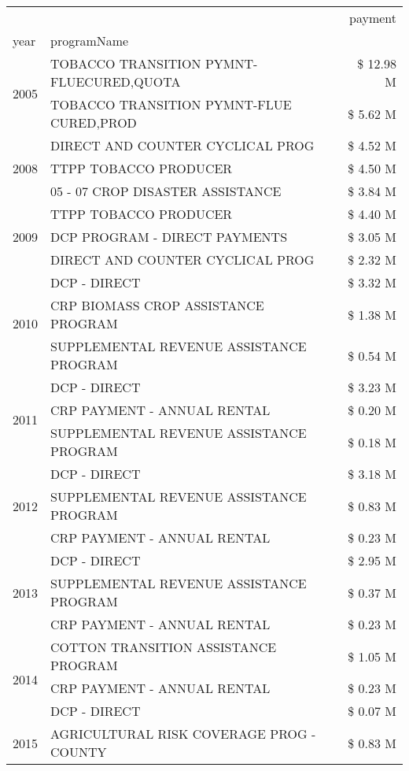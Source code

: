 \begin{tabular}{llr}
\toprule
 &  & payment \\
year & programName &  \\
\midrule
\multirow[t]{2}{*}{2005} & TOBACCO TRANSITION PYMNT-FLUECURED,QUOTA & \$ 12.98 M \\
 & TOBACCO TRANSITION PYMNT-FLUE CURED,PROD & \$ 5.62 M \\
\cline{1-3}
\multirow[t]{3}{*}{2008} & DIRECT AND COUNTER CYCLICAL PROG & \$ 4.52 M \\
 & TTPP TOBACCO PRODUCER & \$ 4.50 M \\
 & 05 - 07 CROP DISASTER ASSISTANCE & \$ 3.84 M \\
\cline{1-3}
\multirow[t]{3}{*}{2009} & TTPP TOBACCO PRODUCER & \$ 4.40 M \\
 & DCP PROGRAM - DIRECT PAYMENTS & \$ 3.05 M \\
 & DIRECT AND COUNTER CYCLICAL PROG & \$ 2.32 M \\
\cline{1-3}
\multirow[t]{3}{*}{2010} & DCP - DIRECT & \$ 3.32 M \\
 & CRP BIOMASS CROP ASSISTANCE PROGRAM & \$ 1.38 M \\
 & SUPPLEMENTAL REVENUE ASSISTANCE PROGRAM & \$ 0.54 M \\
\cline{1-3}
\multirow[t]{3}{*}{2011} & DCP - DIRECT & \$ 3.23 M \\
 & CRP PAYMENT - ANNUAL RENTAL & \$ 0.20 M \\
 & SUPPLEMENTAL REVENUE ASSISTANCE PROGRAM & \$ 0.18 M \\
\cline{1-3}
\multirow[t]{3}{*}{2012} & DCP - DIRECT & \$ 3.18 M \\
 & SUPPLEMENTAL REVENUE ASSISTANCE PROGRAM & \$ 0.83 M \\
 & CRP PAYMENT - ANNUAL RENTAL & \$ 0.23 M \\
\cline{1-3}
\multirow[t]{3}{*}{2013} & DCP - DIRECT & \$ 2.95 M \\
 & SUPPLEMENTAL REVENUE ASSISTANCE PROGRAM & \$ 0.37 M \\
 & CRP PAYMENT - ANNUAL RENTAL & \$ 0.23 M \\
\cline{1-3}
\multirow[t]{3}{*}{2014} & COTTON TRANSITION ASSISTANCE PROGRAM & \$ 1.05 M \\
 & CRP PAYMENT - ANNUAL RENTAL & \$ 0.23 M \\
 & DCP - DIRECT & \$ 0.07 M \\
\cline{1-3}
\multirow[t]{3}{*}{2015} & AGRICULTURAL RISK COVERAGE PROG - COUNTY & \$ 0.83 M \\

\end{tabular}
